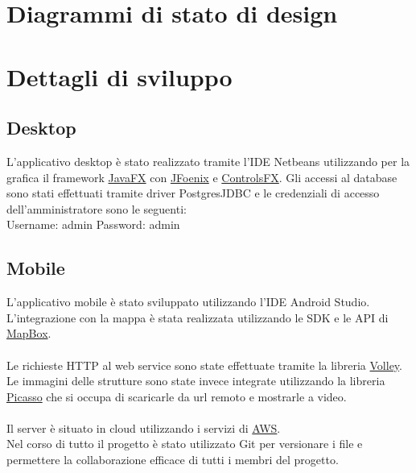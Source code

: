 \section{Diagrammi di stato di design}

 
 
 

\section{Dettagli di sviluppo}
\subsection{Desktop}
L'applicativo desktop è stato realizzato tramite l'IDE Netbeans utilizzando per la grafica il framework \href{https://openjfx.io/}{JavaFX} 
con \href{http://www.jfoenix.com/}{JFoenix} e \href{https://github.com/controlsfx/controlsfx}{ControlsFX}.
Gli accessi al database sono stati effettuati tramite driver PostgresJDBC e le credenziali di accesso dell'amministratore sono le seguenti:\\
Username: admin 
Password: admin

\subsection{Mobile}
L'applicativo mobile è stato sviluppato utilizzando l'IDE Android Studio.\\
L'integrazione con la mappa è stata realizzata utilizzando le SDK e le API di \href{https://www.mapbox.com/}{MapBox}.\\
\\Le richieste HTTP al web service sono state effettuate tramite la libreria \href{https://developer.android.com/training/volley}{Volley}.
\\Le immagini delle strutture sono state invece integrate utilizzando la libreria \href{https://square.github.io/picasso/}{Picasso} che si occupa di scaricarle da url remoto e mostrarle a video.
\\\\
Il server è situato in cloud utilizzando i servizi di \href{https://aws.amazon.com/it/}{AWS}.\\
Nel corso di tutto il progetto è stato utilizzato Git per versionare i file e permettere la collaborazione efficace di tutti i membri del progetto.